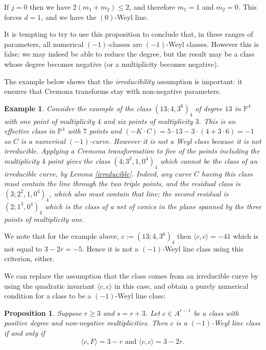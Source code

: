 \documentclass[12pt]{article}
\newtheorem{proposition}[equation]{Proposition}
\newtheorem{example}[equation]{Example}
\numberwithin{equation}{section}
\numberwithin{subeq}{equation}
\def\bbP{\mathbb{P}}
\begin{document}
If $j=0$ then we have $2(m_1+m_2) \leq 2$,
and therefore $m_1=1$ and $m_2=0$.
This forces $d=1$, and we have the $(0)$-Weyl line.


It is tempting to try to use this proposition to conclude that,
in these ranges of parameters,
all numerical $(-1)$-classes are $(-1)$-Weyl classes.
However this is false:
we may indeed be able to reduce the degree,
but the result may be a class whose degree becomes negative
(or a multiplicity becomes negative).

The example below shows that the \textit{irreducibility} assumption is important:
it ensures that Cremona transforms stay with non-negative parameters.

\begin{example}
Consider the example of the class $(13;4,3^6)_4$
 of degree $13$ in $\bbP^4$ with one point of multiplicity $4$
and six points of multiplicity $3$.
This is an effective class in $\bbP^4$ with $7$ points
and $(-K\cdot C) = 5 \cdot 13 - 3\cdot (4 + 3 \cdot 6) = -1$ so $C$ is a numerical $(-1)$-curve.
However it is not a Weyl class because it is not irreducible.
Applying a Cremona transformation to five of the points including the multiplicity $4$ point
gives the class $(4;3^2,1,0^4)_4$
which cannot be the class of an irreducible curve,
by Lemma \ref{irreducible}.
Indeed, any curve $C$ having this class must contain the line through the two triple points,
and the residual class is $(3;2^2,1,0^4)_4$,
which also must contain that line;
the second residual is $(2;1^3,0^4)_4$
which is the class of a net of conics in the plane spanned by the three points of multiplicity one.
\end{example}

We note that for the example above, $c:=(13;4,3^6)_4$ then $\langle c, c \rangle = -41$
which is not equal to $3-2r = -5$.
Hence it is not a $(-1)$-Weyl line class using this criterion, either.


We can replace the assumption that the class comes from an irreducible curve
by using the quadratic invariant $\langle c,c\rangle$ in this case,
and obtain a purely numerical condition for a class to be a $(-1)$-Weyl line class:

\begin{proposition}\label{rplus3points}
Suppose $r\geq 3$ and $s = r+3$.
Let $c \in A^{r-1}$ be a class with positive degree and non-negative multiplicities.
Then $c$ is a $(-1)$-Weyl line class if and only if
\[
\langle c, F \rangle = 3-r \text{ and } \langle c,c\rangle = 3-2r.
\]
\end{proposition}
\end{document}
